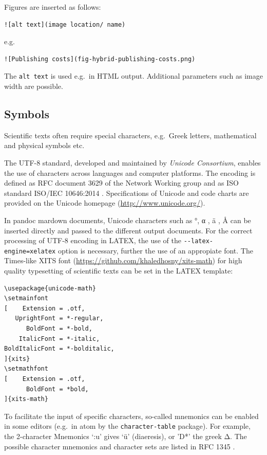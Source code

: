 \documentclass[10pt,fleqn]{wlpeerj}
\begin{document}
Figures
are
inserted
as
follows:

\begin{verbatim}
![alt text](image location/ name)
\end{verbatim}

e.g.

\begin{verbatim}
![Publishing costs](fig-hybrid-publishing-costs.png)
\end{verbatim}

The
\texttt{alt\ text}
is
used
e.g.~in
HTML
output.
Additional
parameters
such
as
image
width
are
possible.

\subsection{Symbols}\label{symbols}

Scientific
texts
often
require
special
characters,
e.g.~Greek
letters,
mathematical
and
physical
symbols
etc.

The
UTF-8
standard,
developed
and
maintained
by
\emph{Unicode
Consortium},
enables
the
use
of
characters
across
languages
and
computer
platforms.
The
encoding
is
defined
as
RFC
document
3629
of
the
Network
Working
group
\citep{rfc3629}
and
as
ISO
standard
ISO/IEC
10646:2014
\citep{international_organization_for_standardization_iso/iec_2014}.
Specifications
of
Unicode
and
code
charts
are
provided
on
the
Unicode
homepage
(\url{http://www.unicode.org/}).

In
pandoc
mardown
documents,
Unicode
characters
such
as °,
α , ä
, Å
can
be
inserted
directly
and
passed
to
the
different
output
documents.
For
the
correct
processing
of
UTF-8
encoding
in
LATEX,
the
use
of
the
\texttt{-\/-latex-engine=xelatex}
option
is
necessary,
further
the
use
of an
appropiate
font.
The
Times-like
XITS
font
(\url{https://github.com/khaledhosny/xits-math})
for
high
quality
typesetting
of
scientific
texts
can
be
set
in
the
LATEX
template:

\begin{verbatim}
\usepackage{unicode-math}
\setmainfont
[    Extension = .otf,
   UprightFont = *-regular,
      BoldFont = *-bold,
    ItalicFont = *-italic,
BoldItalicFont = *-bolditalic,
]{xits}
\setmathfont
[    Extension = .otf,
      BoldFont = *bold,
]{xits-math}
\end{verbatim}

To
facilitate
the
input
of
specific
characters,
so-called
mnemonics
can
be
enabled
in
some
editors
(e.g.~in
atom
by
the
\texttt{character-table}
package).
For
example,
the
2-character
Mnemonics
`:u'
gives
`ü'
(diaeresis),
or
'D*'
the
greek
Δ.
The
possible
character
mnemonics
and
character
sets
are
listed
in
RFC
1345
\citep{rfc1345}.
\end{document}
